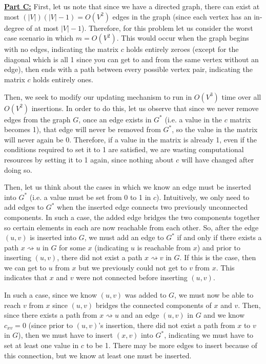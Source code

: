 \documentclass[11pt]{article}
\begin{document}
\underline{\textbf{Part C:}} First, let us note that since we have a directed graph, there can exist at most $(|V|)(|V|-1) = O(V^2)$ edges in the graph (since each vertex has an in-degree of at most $|V| - 1$). Therefore, for this problem let us consider the worst case scenario in which $m = O(V^2)$. This would occur when the graph begins with no edges, indicating the matrix $c$ holds entirely zeroes (except for the diagonal which is all 1 since you can get to and from the same vertex without an edge), then ends with a path between every possible vertex pair, indicating the matrix $c$ holds entirely ones.

Then, we seek to modify our updating mechanism to run in $O(V^3)$ time over all $O(V^2)$ insertions. In order to do this, let us observe that since we never remove edges from the graph $G$, once an edge exists in $G^*$ (i.e. a value in the $c$ matrix becomes 1), that edge will never be removed from $G^*$, so the value in the matrix will never again be 0. Therefore, if a value in the matrix is already 1, even if the conditions required to set it to 1 are satisfied, we are wasting computational resources by setting it to 1 again, since nothing about $c$ will have changed after doing so.

Then, let us think about the cases in which we know an edge must be inserted into $G^*$ (i.e. a value must be set from 0 to 1 in $c$). Intuitively, we only need to add edges to $G^*$ when the inserted edge connects two previously unconnected components. In such a case, the added edge bridges the two components together so certain elements in each are now reachable from each other. So, after the edge $(u,v)$ is inserted into $G$, we must add an edge to $G^*$ if and only if there exists a path $x \rightsquigarrow u$ in $G$ for some $x$ (indicating $u$ is reachable from $x$) and prior to inserting $(u,v)$, there did not exist a path $x \rightsquigarrow v$ in $G$. If this is the case, then we can get to $u$ from $x$ but we previously could not get to $v$ from $x$. This indicates that $x$ and $v$ were not connected before inserting $(u,v)$.

In such a case, since we know $(u,v)$ was added to $G$, we must now be able to reach $v$ from $x$ since $(u,v)$ bridges the connected components of $x$ and $v$. Then, since there exists a path from $x \rightsquigarrow u$ and an edge $(u,v)$ in $G$ and we know $c_{xv} = 0$ (since prior to $(u,v)$'s insertion, there did not exist a path from $x$ to $v$ in $G$), then we must have to insert $(x,v)$ into $G^*$, indicating we must have to set at least one value in $c$ to be 1. There may be more edges to insert because of this connection, but we know at least one must be inserted.
\end{document}
